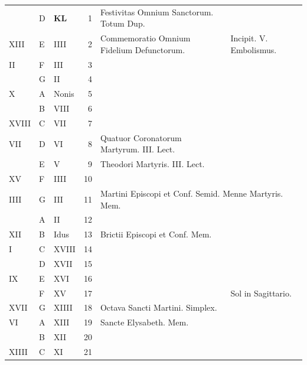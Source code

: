 \documentclass[11pt,openany]{book}
\begin{document}
\begin{center}
\begin{tabular}{l | l | l | r | l l}
\color{Red}  & D & \textbf{\color{Red} K\color{Blue}L} & 1 & Festivitas Omnium Sanctorum. Totum Dup. & \color{Red} \\
\color{Red} XIII & E & \color{Red} IIII & 2 & Commemoratio Omnium Fidelium Defunctorum. & \color{Red} Incipit. V. Embolismus. \\
\color{Red} II & F & \color{Red} III & 3 & & \color{Red} \\
\color{Red}  & G & \color{Red} II & 4 & & \color{Red} \\
\color{Red} X & \color{Red} A & \color{Red} Nonis & 5 & & \color{Red} \\
\color{Red}  & B & \color{Red} VIII & 6 & & \color{Red} \\
\color{Red} XVIII & C & \color{Red} VII & 7 & & \color{Red} \\
\color{Red} VII & D & \color{Red} VI & 8 & Quatuor Coronatorum Martyrum. III. Lect. & \color{Red} \\
\color{Red}  & E & \color{Red} V & 9 & Theodori Martyris. III. Lect. & \color{Red} \\
\color{Red} XV & F & \color{Red} IIII & 10 & & \color{Red} \\
\color{Red} IIII & G & \color{Red} III & 11 & \multicolumn{2}{l}{\color{Red} Martini Episcopi et Conf. Semid. Menne Martyris. Mem.} \color{Red} \\
\color{Red}  & \color{Red} A & \color{Red} II & 12 &  & \color{Red} \\
\color{Red} XII & B & \color{Red} Idus & 13 & Brictii Episcopi et Conf. Mem. & \color{Red} \\
\color{Red} I & C & \color{Red} XVIII & 14 & & \color{Red} \\
\color{Red}  & D & \color{Red} XVII & 15 & & \color{Red} \\
\color{Red} IX & E & \color{Red} XVI & 16 & & \color{Red} \\
\color{Red}  & F & \color{Red} XV & 17 &  & \color{Red} Sol in Sagittario. \\
\color{Red} XVII & G & \color{Red} XIIII & 18 & Octava Sancti Martini. \color{Red} Simplex. \\
\color{Red} VI & \color{Red} A & \color{Red} XIII & 19 & Sancte Elysabeth. Mem. & \color{Red} \\
\color{Red}  & B & \color{Red} XII & 20 & & \color{Red} \\
\color{Red} XIIII & C & \color{Red} XI & 21 & & \color{Red} \\

\end{tabular}
\end{center}
\end{document}
